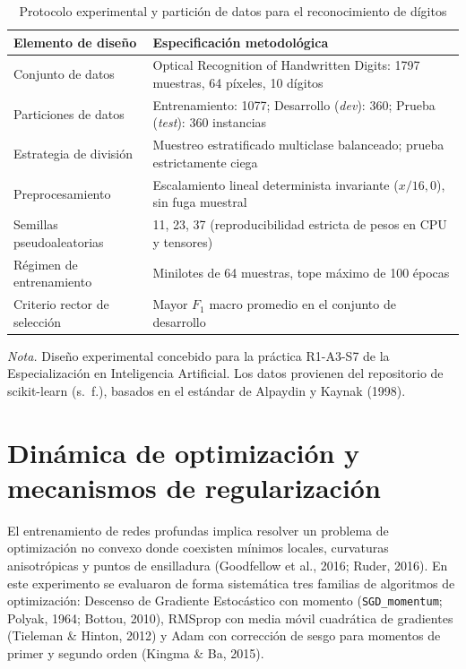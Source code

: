 \documentclass[12pt,letterpaper]{article}
\newcommand{\nota}[1]{\par\noindent\small\textit{Nota.} #1\par\normalsize}
\begin{document}
\begin{table}[H]\caption{Protocolo experimental y partición de datos para el reconocimiento de dígitos}\label{tab:protocolo}
\begin{singlespace}\small\centering\begin{tabularx}{\textwidth}{>{\raggedright\arraybackslash}p{} X}\toprule
Elemento de diseño & Especificación metodológica \\\midrule
Conjunto de datos & Optical Recognition of Handwritten Digits: 1797 muestras, 64 píxeles, 10 dígitos \\
Particiones de datos & Entrenamiento: 1077; Desarrollo (\textit{dev}): 360; Prueba (\textit{test}): 360 instancias \\
Estrategia de división & Muestreo estratificado multiclase balanceado; prueba estrictamente ciega \\
Preprocesamiento & Escalamiento lineal determinista invariante ($x / 16{,}0$), sin fuga muestral \\
Semillas pseudoaleatorias & 11, 23, 37 (reproducibilidad estricta de pesos en CPU y tensores) \\
Régimen de entrenamiento & Minilotes de 64 muestras, tope máximo de 100 épocas \\
Criterio rector de selección & Mayor $F_1$ macro promedio en el conjunto de desarrollo \\\bottomrule
\end{tabularx}\end{singlespace}\nota{Diseño experimental concebido para la práctica R1-A3-S7 de la Especialización en Inteligencia Artificial. Los datos provienen del repositorio de scikit-learn (s.~f.), basados en el estándar de Alpaydin y Kaynak (1998).}
\end{table}

\section{Dinámica de optimización y mecanismos de regularización}
El entrenamiento de redes profundas implica resolver un problema de optimización no convexo donde coexisten mínimos locales, curvaturas anisotrópicas y puntos de ensilladura (Goodfellow et al., 2016; Ruder, 2016). En este experimento se evaluaron de forma sistemática tres familias de algoritmos de optimización: Descenso de Gradiente Estocástico con momento (\texttt{SGD\_momentum}; Polyak, 1964; Bottou, 2010), RMSprop con media móvil cuadrática de gradientes (Tieleman \& Hinton, 2012) y Adam con corrección de sesgo para momentos de primer y segundo orden (Kingma \& Ba, 2015).
\end{document}
